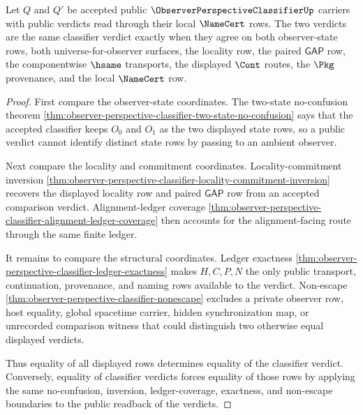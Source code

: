 \begin{theorem}
\label{thm:observerperspectiveclassifier-classifier-determinacy}
Let $Q$ and $Q'$ be accepted public $\ObserverPerspectiveClassifierUp$ carriers with public verdicts read through their local $\NameCert$ rows. The two verdicts are the same classifier verdict exactly when they agree on both observer-state rows, both universe-for-observer surfaces, the locality row, the paired $\mathsf{GAP}$ row, the componentwise $\hsame$ transports, the displayed $\Cont$ routes, the $\Pkg$ provenance, and the local $\NameCert$ row.
\end{theorem}
\begin{proof}
First compare the observer-state coordinates. The two-state no-confusion theorem \autoref{thm:observer-perspective-classifier-two-state-no-confusion} says that the accepted classifier keeps $O_0$ and $O_1$ as the two displayed state rows, so a public verdict cannot identify distinct state rows by passing to an ambient observer.

Next compare the locality and commitment coordinates. Locality-commitment inversion \autoref{thm:observer-perspective-classifier-locality-commitment-inversion} recovers the displayed locality row and paired $\mathsf{GAP}$ row from an accepted comparison verdict. Alignment-ledger coverage \autoref{thm:observer-perspective-classifier-alignment-ledger-coverage} then accounts for the alignment-facing route through the same finite ledger.

It remains to compare the structural coordinates. Ledger exactness \autoref{thm:observer-perspective-classifier-ledger-exactness} makes $H,C,P,N$ the only public transport, continuation, provenance, and naming rows available to the verdict. Non-escape \autoref{thm:observer-perspective-classifier-nonescape} excludes a private observer row, host equality, global spacetime carrier, hidden synchronization map, or unrecorded comparison witness that could distinguish two otherwise equal displayed verdicts.

Thus equality of all displayed rows determines equality of the classifier verdict. Conversely, equality of classifier verdicts forces equality of those rows by applying the same no-confusion, inversion, ledger-coverage, exactness, and non-escape boundaries to the public readback of the verdicts.
\end{proof}

